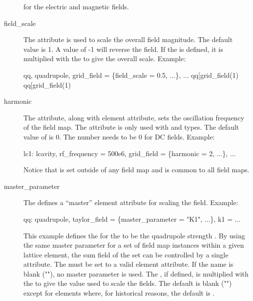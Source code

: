 \begin{description}
for the electric and magnetic fields.
  \item[field_scale] \Newline
The  attribute is used to scale the overall field magnitude. The default
value is 1. A value of -1 will reverse the field. If the  is
defined, it is multiplied with the  to give the overall scale.
Example:
\begin{example}
  qq, quadrupole, grid_field = \{field_scale = 0.5, ...\}, ...
  qq[grid_field(1)%
  qq[grid_field(1)%
\end{example}
  \item[harmonic] \Newline
The  attribute, along with  element attribute, sets the oscillation
frequency of the field map. The  attribute is only used with  and
 types. The default value of  is 0.  The  number needs to
be 0 for DC fields. Example:
\begin{example}
  lc1: lcavity, rf_frequency = 500e6, grid_field = \{harmonic = 2, ...\}, ...
\end{example}
Notice that  is set outside of any field map and is common to all field maps.
  \item[master_parameter] \Newline
The  defines a ``master'' element attribute for scaling the field. Example:
\begin{example}
  qq: quadrupole, taylor_field = \{master_parameter = "K1", ...\}, k1 = ...
\end{example}
This example defines the  for the  to be the
quadrupole strength . By using the same master parameter for a set of field map
instances within a given lattice element, the sum field of the set can be controlled by a
single attribute. The  must be set to a valid element attribute. If
the name is blank (""), no master parameter is used. The , if
defined, is multiplied with the  to give the value used to scale the
fields. The default  is blank ("") except for  elements
where, for historical reasons, the default is .


\end{description}
